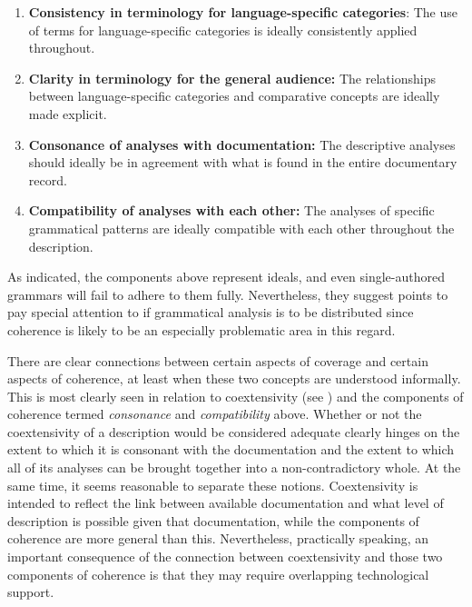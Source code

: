 \begin{enumerate}%

	\item{{\bf Consistency in terminology for language-specific categories}: The use
	of terms for language-specific categories is ideally consistently applied
	throughout.}

	\item{{\bf Clarity in terminology for the general audience:} The
	relationships between language-specific categories and comparative concepts
	\citep[in the sense of][]{Haspelmath:Comparative} are ideally made explicit. \label{ClarityP}}
	
	\item{{\bf Consonance of analyses with documentation:} The descriptive
	analyses should ideally be in agreement with what is found in the
	entire documentary record. \label{Consonance}}

	\item{{\bf Compatibility of analyses with each other:} The analyses of
	specific grammatical patterns are ideally compatible with each other
	throughout the description. \label{Compatibility}}

\end{enumerate}

As indicated, the components above represent ideals, and even
single-authored grammars will fail to adhere to them fully. Nevertheless, they
suggest points to pay special attention to if grammatical analysis is to be
distributed since coherence is likely to be an especially problematic area in
this regard.

There are clear connections between certain aspects of coverage and certain
aspects of coherence, at least when these two concepts are understood
informally. This is most clearly seen in relation to coextensivity (see
) and the components of coherence termed \emph{consonance}
and \emph{compatibility} above. Whether or not the coextensivity of a
description would be considered adequate clearly hinges on the extent to which
it is consonant with the documentation and the extent to which all of its
analyses can be brought together into a non-contradictory whole. At the same
time, it seems reasonable to separate these notions. Coextensivity is
intended to reflect the link between available documentation and what
level of description is possible given that documentation, while the
components of coherence are more general than this.
Nevertheless, practically speaking, an important consequence of
the connection between coextensivity and those two components of coherence is
that they may require overlapping technological support.


